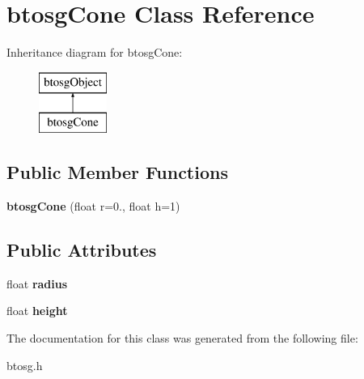 \hypertarget{classbtosgCone}{}\section{btosg\+Cone Class Reference}
\label{classbtosgCone}
Inheritance diagram for btosg\+Cone\+:\begin{figure}[H]
\begin{center}
\leavevmode
\includegraphics[height=2.000000cm]{classbtosgCone}
\end{center}
\end{figure}
\subsection*{Public Member Functions}
\begin{DoxyCompactItemize}
\item 
\mbox{\label{classbtosgCone_a119bf79e2311ba084939d3e25086751c}} 
{\bfseries btosg\+Cone} (float r=0., float h=1)
\end{DoxyCompactItemize}
\subsection*{Public Attributes}
\begin{DoxyCompactItemize}
\item 
\mbox{\label{classbtosgCone_a75e351e13ad1e4d402f44a36838a6f4a}} 
float {\bfseries radius}
\item 
\mbox{\label{classbtosgCone_a1ddcbd82ff1fbaf69bc99d242819b83f}} 
float {\bfseries height}
\end{DoxyCompactItemize}


The documentation for this class was generated from the following file\+:\begin{DoxyCompactItemize}
\item 
btosg.\+h\end{DoxyCompactItemize}
